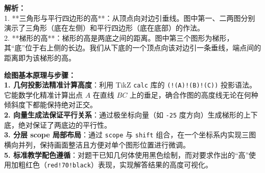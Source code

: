 \begin{center}
\end{center}

\vspace{0.8cm}

{\small\color{gray}
\textbf{解析：}\\
1. **三角形与平行四边形的高**：从顶点向对边引垂线。图中第一、二两图分别演示了三角形（底在左侧）和平行四边形（底在底部）的作法。\\
2. **梯形的高**：梯形的高是两底之间的距离。图中第三个图形为梯形，其“底”位于右上侧的长边。我们从下底的一个顶点向该对边引一条垂线，端点间的距离即为该梯形的高。
}

\vspace{0.6cm}

{\small\color{blue!70!black}
\textbf{绘图基本原理与步骤：}\\
\textbf{1. 几何投影法精准计算高度}：利用 TikZ \texttt{calc} 库的 \texttt{(!(A)!(B)!(C))} 投影语法。它能数学化精准计算出点 $A$ 在直线 $BC$ 上的垂足，确合作图的高度线无论在何种倾斜度下都能保持绝对正交。\\
\textbf{2. 向量生成法保证平行关系}：通过极坐标向量（如 \texttt{-25} 度方向）生成梯形的上下底，绝对保证了两底边的平行性。\\
\textbf{3. 分层 scope 局部布局}：通过 \texttt{scope} 与 \texttt{shift} 组合，在一个坐标系内实现三图横向并列，保持画面整洁且方便对单个图形位置进行微调。\\
\textbf{5. 标准教学配色遵循}：对题干已知几何体使用黑色绘制，而对要求作出的“高”使用加粗红色（\texttt{red!70!black}）表现，实现解答结果的高度可视化。
}

\newpage




